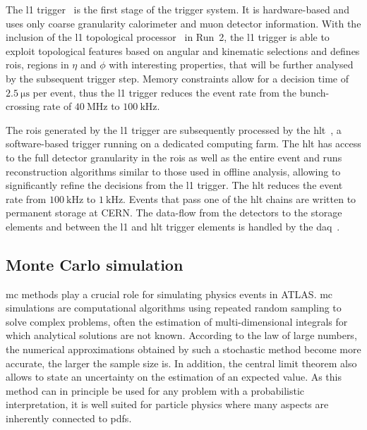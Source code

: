 The \gls{l1} trigger~\cite{CERN-LHCC-98-014} is the first stage of the trigger system. It is hardware-based and uses only coarse granularity calorimeter and muon detector information. With the inclusion of the \gls{l1} topological processor~\cite{Aad:2020wji} in Run~2, the \gls{l1} trigger is able to exploit topological features based on angular and kinematic selections and defines \glspl{roi}, \ie regions in $\eta$ and $\phi$ with interesting properties, that will be further analysed by the subsequent trigger step. Memory constraints allow for a decision time of $\SI{2.5}{\micro\second}$ per event, thus the \gls{l1} trigger reduces the event rate from the bunch-crossing rate of $\SI{40}{\MHz}$ to $\SI{100}{\kHz}$. 

The \glspl{roi} generated by the \gls{l1} trigger are subsequently processed by the \gls{hlt}~\cite{Jenni:616089}, a software-based trigger running on a dedicated computing farm. The \gls{hlt} has access to the full detector granularity in the \glspl{roi} as well as the entire event and runs reconstruction algorithms similar to those used in offline analysis, allowing to significantly refine the decisions from the \gls{l1} trigger. The \gls{hlt} reduces the event rate from $\SI{100}{\kHz}$ to $\SI{1}{\kHz}$. Events that pass one of the \gls{hlt} chains are written to permanent storage at CERN. The data-flow from the detectors to the storage elements and between the \gls{l1} and \gls{hlt} trigger elements is handled by the \gls{daq}~\cite{Jenni:616089}.


\subsection{Monte Carlo simulation}\label{sec:mc_simulation}


\gls{mc} methods play a crucial role for simulating physics events in ATLAS. \gls{mc} simulations are computational algorithms using repeated random sampling to solve complex problems, often the estimation of multi-dimensional integrals for which analytical solutions are not known. According to the law of large numbers, the numerical approximations obtained by such a stochastic method become more accurate, the larger the sample size is. In addition, the central limit theorem also allows to state an uncertainty on the estimation of an expected value. As this method can in principle be used for any problem with a probabilistic interpretation, it is well suited for particle physics where many aspects are inherently connected to \glspl{pdf}. 

